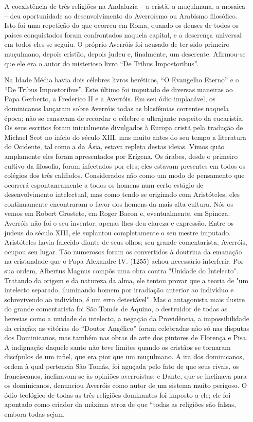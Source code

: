 \documentclass[11pt,a5paper,twoside,openany]{book}
\begin{document}
A coexistência de três religiões na Andaluzia – a cristã, a muçulmana, a mosaica – deu oportunidade ao desenvolvimento do Averroísmo ou Arabismo filosófico. Isto foi uma repetição do que ocorreu em Roma, quando os deuses de todos os países conquistados foram confrontados naquela capital, e a descrença universal em todos eles se seguiu. O próprio Averróis foi acusado de ter sido primeiro muçulmano, depois cristão, depois judeu e, finalmente, um descrente. Afirmou-se que ele era o autor do misterioso livro “De Tribus Impostoribus”.

Na Idade Média havia dois célebres livros heréticos, “O Evangelho Eterno” e o “De Tribus Impostoribus”. Este último foi imputado de diversas maneiras ao Papa Gerberto, a Frederico II e a Averróis. Em seu ódio implacável, os dominicanos lançaram sobre Averróis todas as blasfêmias correntes naquela época; não se cansavam de recordar o célebre e ultrajante respeito da eucaristia. Os seus escritos foram inicialmente divulgados à Europa cristã pela tradução de Michael Scot no início do século XIII, mas muito antes do seu tempo a literatura do Ocidente, tal como a da Ásia, estava repleta destas ideias. Vimos quão amplamente eles foram apresentados por Erígena. Os árabes, desde o primeiro cultivo da filosofia, foram infectados por eles; eles estavam presentes em todos os colégios dos três califados. Considerados não como um modo de pensamento que ocorrerá espontaneamente a todos os homens num certo estágio de desenvolvimento intelectual, mas como tendo se originado com Aristóteles, eles continuamente encontraram o favor dos homens da mais alta cultura. Nós os vemos em Robert Grostete, em Roger Bacon e, eventualmente, em Spinoza. Averróis não foi o seu inventor, apenas lhes deu clareza e expressão. Entre os judeus do século XIII, ele suplantou completamente o seu mestre imputado. Aristóteles havia falecido diante de seus olhos; seu grande comentarista, Averróis, ocupou seu lugar. Tão numerosos foram os convertidos à doutrina da emanação na cristandade que o Papa Alexandre IV. (1255) achou necessário interferir. Por sua ordem, Albertus Magnus compôs uma obra contra "Unidade do Intelecto". Tratando da origem e da natureza da alma, ele tentou provar que a teoria de "um intelecto separado, iluminando homem por irradiação anterior ao indivíduo e sobrevivendo ao indivíduo, é um erro detestável". Mas o antagonista mais ilustre do grande comentarista foi São Tomás de Aquino, o destruidor de todas as heresias como a unidade do intelecto, a negação da Providência, a impossibilidade da criação; as vitórias do “Doutor Angélico” foram celebradas não só nas disputas dos Dominicanos, mas também nas obras de arte dos pintores de Florença e Pisa. A indignação daquele santo não teve limites quando os cristãos se tornaram discípulos de um infiel, que era pior que um muçulmano. A ira dos dominicanos, ordem à qual pertencia São Tomás, foi aguçada pelo fato de que seus rivais, os franciscanos, inclinavam-se às opiniões averroístas; e Dante, que se inclinava para os dominicanos, denunciou Averróis como autor de um sistema muito perigoso. O ódio teológico de todas as três religiões dominantes foi imposto a ele; ele foi apontado como criador da máxima atroz de que “todas as religiões são falsas, embora todas sejam 
\end{document}
